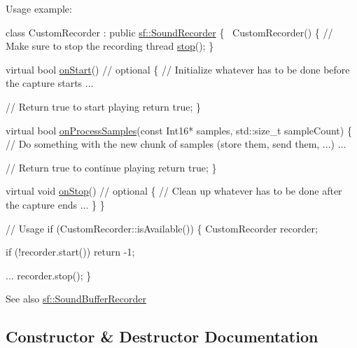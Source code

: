 Usage example\+: 
\begin{DoxyCode}
\textcolor{keyword}{class }CustomRecorder : \textcolor{keyword}{public} \hyperlink{classsf_1_1_sound_recorder}{sf::SoundRecorder}
\{
    ~CustomRecorder()
    \{
        \textcolor{comment}{// Make sure to stop the recording thread}
        \hyperlink{classsf_1_1_sound_recorder_a8d9c8346aa9aa409cfed4a1101159c4c}{stop}();
    \}

    \textcolor{keyword}{virtual} \textcolor{keywordtype}{bool} \hyperlink{classsf_1_1_sound_recorder_a7af418fb036201d3f85745bef78ce77f}{onStart}() \textcolor{comment}{// optional}
    \{
        \textcolor{comment}{// Initialize whatever has to be done before the capture starts}
        ...

        \textcolor{comment}{// Return true to start playing}
        \textcolor{keywordflow}{return} \textcolor{keyword}{true};
    \}

    \textcolor{keyword}{virtual} \textcolor{keywordtype}{bool} \hyperlink{classsf_1_1_sound_recorder_a2670124cbe7a87c7e46b4840807f4fd7}{onProcessSamples}(\textcolor{keyword}{const} Int16* samples, std::size\_t sampleCount)
    \{
        \textcolor{comment}{// Do something with the new chunk of samples (store them, send them, ...)}
        ...

        \textcolor{comment}{// Return true to continue playing}
        \textcolor{keywordflow}{return} \textcolor{keyword}{true};
    \}

    \textcolor{keyword}{virtual} \textcolor{keywordtype}{void} \hyperlink{classsf_1_1_sound_recorder_aefc36138ca1e96c658301280e4a31b64}{onStop}() \textcolor{comment}{// optional}
    \{
        \textcolor{comment}{// Clean up whatever has to be done after the capture ends}
        ...
    \}
\}

\textcolor{comment}{// Usage}
\textcolor{keywordflow}{if} (CustomRecorder::isAvailable())
\{
    CustomRecorder recorder;

    \textcolor{keywordflow}{if} (!recorder.start())
        \textcolor{keywordflow}{return} -1;

    ...
    recorder.stop();
\}
\end{DoxyCode}


\begin{DoxySeeAlso}{See also}
\hyperlink{classsf_1_1_sound_buffer_recorder}{sf\+::\+Sound\+Buffer\+Recorder} 
\end{DoxySeeAlso}


\subsection{Constructor \& Destructor Documentation}
\mbox{\label{classsf_1_1_sound_recorder_a50ebad413c4f157408a0fa49f23212a9}} 

